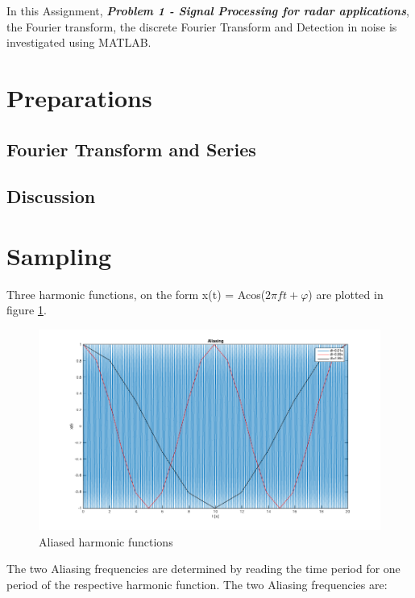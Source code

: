 \documentclass[12pt]{article}
\begin{document}
In this Assignment, \textit{\textbf{Problem 1 - Signal Processing for radar applications}}, the Fourier transform, the discrete Fourier Transform and Detection in noise is investigated using MATLAB.


\section{Preparations}

\subsection{Fourier Transform and Series}


\subsection{Discussion}


\section{Sampling}
Three  harmonic functions, on the form x(t) = Acos($2 \pi ft + \varphi $) are plotted in figure \ref{fig:sampling}.

\begin{figure}[h]
	\centering
	\includegraphics[width=\linewidth]{images/ass1_2}	
	\caption{Aliased harmonic functions}
	\label{fig:sampling}
\end{figure}
The two Aliasing frequencies are determined by reading the time period for one period of the respective harmonic function.
The two Aliasing frequencies are:
\end{document}

